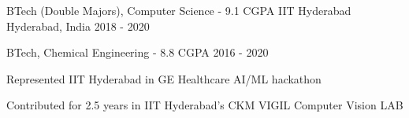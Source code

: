 

\begin{cventries}

  \cventry
    {BTech (Double Majors), Computer Science - 9.1 CGPA} %
    {IIT Hyderabad} %
    {Hyderabad, India} %
    {2018 - 2020} %
    {
    }

  \vspace{-6mm}
    
  \cventry
    {BTech, Chemical Engineering - 8.8 CGPA} %
    { } %
    { } %
    {2016 - 2020} %
    {
      \begin{cvitems} %
        \item {Represented IIT Hyderabad in GE Healthcare AI/ML hackathon}
        \item {Contributed for 2.5 years in IIT Hyderabad's CKM VIGIL Computer Vision LAB} 
      \end{cvitems}
    }
\end{cventries}
